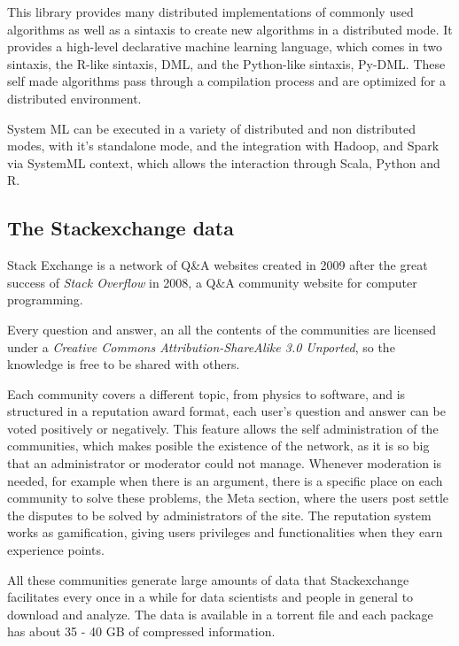 \documentclass[11pt]{article} %
\begin{document}
    This library provides many distributed implementations of commonly used algorithms as well as a sintaxis to create new algorithms in a distributed mode. It provides a high-level declarative machine learning language, which comes in two sintaxis, the R-like sintaxis, DML, and the Python-like sintaxis, Py-DML. These self made algorithms pass through a compilation process and are optimized for a distributed environment.

    System ML can be executed in a variety of distributed and non distributed modes, with it's standalone mode, and the integration with Hadoop, and Spark via SystemML context, which allows the interaction through Scala, Python and R.


  \subsection{The Stackexchange data}
  \label{subsec:data_structure}


    Stack Exchange is a network of Q\&A websites created in 2009 after the great success of \emph{Stack Overflow} in 2008, a Q\&A community website for computer programming.

    Every question and answer, an all the contents of the communities are licensed under a \emph{Creative Commons Attribution-ShareAlike 3.0 Unported}, so the knowledge is free to be shared with others.

    Each community covers a different topic, from physics to software, and is structured in a reputation award format, each user's question and answer can be voted positively or negatively. This feature allows the self administration of the communities, which makes posible the existence of the network, as it is so big that an administrator or moderator could not manage. Whenever moderation is needed, for example when there is an argument, there is a specific place on each community to solve these problems, the Meta section, where the users post settle the disputes to be solved by administrators of the site. The reputation system works as gamification, giving users privileges and functionalities when they earn experience points.

    All these communities generate large amounts of data that Stackexchange facilitates every once in a while for data scientists and people in general to download and analyze. The data is available in a torrent file and each package has about 35 - 40 GB of compressed information.
\end{document}

